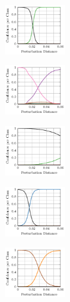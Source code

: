 \begin{figure}[t]
\begin{subfigure}{0.19\textwidth}
    \end{subfigure}
    \\
    \begin{subfigure}{0.19\textwidth}
        \includegraphics[height=2.2cm]{fig_svhn_advtrain_5_adversarial}
    \end{subfigure}
    \begin{subfigure}{0.19\textwidth}
        \includegraphics[height=2.2cm]{fig_svhn_advtrain_6_adversarial}
    \end{subfigure}
    \begin{subfigure}{0.19\textwidth}
        \includegraphics[height=2.2cm]{fig_svhn_advtrain_7_adversarial}
    \end{subfigure}
    \begin{subfigure}{0.19\textwidth}
        \includegraphics[height=2.2cm]{fig_svhn_advtrain_8_adversarial}
    \end{subfigure}
    \begin{subfigure}{0.19\textwidth}
        \includegraphics[height=2.2cm]{fig_svhn_advtrain_9_adversarial}
    \end{subfigure}
    \\[4px]
    \begin{subfigure}{1\textwidth}

\end{subfigure}
\end{figure}
